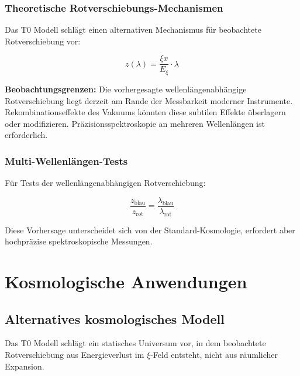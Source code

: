 \documentclass[12pt,a4paper]{report}
\newcommand{\Exi}{E_\xi}
\begin{document}
	\subsection{Theoretische Rotverschiebungs-Mechanismen}
	
	Das T0 Modell schlägt einen alternativen Mechanismus für beobachtete Rotverschiebung vor:
	
	\begin{equation}
		z(\lambda) = \frac{\xi x}{\Exi} \cdot \lambda
	\end{equation}
	
	\begin{vorsicht}
		\textbf{Beobachtungsgrenzen:} Die vorhergesagte wellenlängenabhängige Rotverschiebung liegt derzeit am Rande der Messbarkeit moderner Instrumente. Rekombinationseffekte des Vakuums könnten diese subtilen Effekte überlagern oder modifizieren. Präzisionsspektroskopie an mehreren Wellenlängen ist erforderlich.
	\end{vorsicht}
	
	\subsection{Multi-Wellenlängen-Tests}
	
	Für Tests der wellenlängenabhängigen Rotverschiebung:
	
	\begin{equation}
		\frac{z_{\text{blau}}}{z_{\text{rot}}} = \frac{\lambda_{\text{blau}}}{\lambda_{\text{rot}}}
	\end{equation}
	
	Diese Vorhersage unterscheidet sich von der Standard-Kosmologie, erfordert aber hochpräzise spektroskopische Messungen.
	
	\chapter{Kosmologische Anwendungen}
	
	\section{Alternatives kosmologisches Modell}
	
	\begin{revolutionaer}
		Das T0 Modell schlägt ein statisches Universum vor, in dem beobachtete Rotverschiebung aus Energieverlust im $\xi$-Feld entsteht, nicht aus räumlicher Expansion.
	\end{revolutionaer}
	
\end{document}
